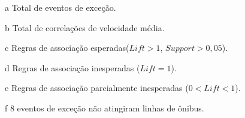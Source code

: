 \documentclass[
	12pt,				%
	oneside,			%
	a4paper,			%
	english,			%
	brazil				%
	]{abntex2ppgsi}
\begin{document}
{{\begin{apendicesenv}
\begin{table}[!htb]
\begin{threeparttable}
\begin{tablenotes}
            \item[a] Total de eventos de exceção.
            \item[b] Total de correlações de velocidade média.
            \item[c] Regras de associação esperadas($Lift > 1$, $Support > 0,05$).
            \item[d] Regras de associação inesperadas ($Lift = 1$).
            \item[e] Regras de associação parcialmente inesperadas ($0 < Lift < 1$).
            \item[f] 8 eventos de exceção não atingiram linhas de ônibus.
        \end{tablenotes}
\end{threeparttable}
\end{table}



\end{apendicesenv}}}
\end{document}
